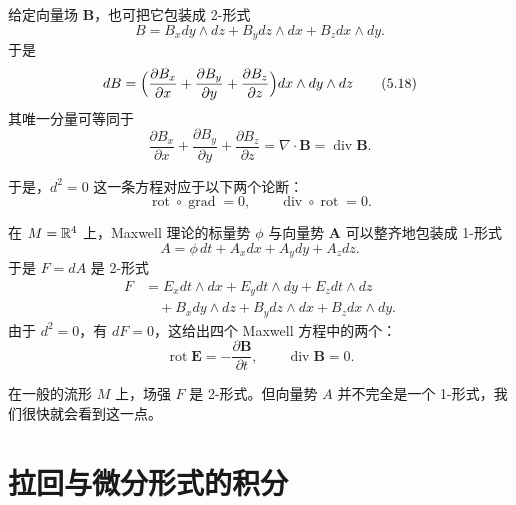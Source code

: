 给定向量场 $\mathbf{B}$，也可把它包装成 2-形式
\begin{equation}
  B=B_xdy\wedge dz+B_ydz\wedge dx+B_zdx\wedge dy.
  \tag{5.17}
\end{equation}
于是
\begin{equation}
  dB=\Bigl(\frac{\partial B_x}{\partial x}+\frac{\partial B_y}{\partial y}+\frac{\partial B_z}{\partial z}\Bigr)dx\wedge dy\wedge dz
  \tag{5.18}
\end{equation}
其唯一分量可等同于
\begin{equation}
  \frac{\partial B_x}{\partial x}+\frac{\partial B_y}{\partial y}+\frac{\partial B_z}{\partial z}
  =\nabla\cdot\mathbf{B}=\operatorname{div}\mathbf{B}.
  \tag{5.19}
\end{equation}

于是，$d^2=0$ 这一条方程对应于以下两个论断：
\begin{equation}
  \operatorname{rot}\circ\operatorname{grad}=0,\qquad
  \operatorname{div}\circ\operatorname{rot}=0.
  \tag{5.20}
\end{equation}

在 $M=\mathbb{R}^4$ 上，Maxwell 理论的标量势 $\phi$ 与向量势 $\mathbf{A}$ 可以整齐地包装成 1-形式
\begin{equation}
  A=\phi\,dt+A_xdx+A_ydy+A_zdz.
  \tag{5.21}
\end{equation}
于是 $F=dA$ 是 2-形式
\begin{equation}
  \begin{aligned}
    F&=E_xdt\wedge dx+E_ydt\wedge dy+E_zdt\wedge dz\\
     &\quad +B_xdy\wedge dz+B_ydz\wedge dx+B_zdx\wedge dy.
  \end{aligned}
  \tag{5.22}
\end{equation}
由于 $d^2=0$，有 $dF=0$，这给出四个 Maxwell 方程中的两个：
\begin{equation}
  \operatorname{rot}\mathbf{E}=-\frac{\partial\mathbf{B}}{\partial t},\qquad
  \operatorname{div}\mathbf{B}=0.
  \tag{5.23}
\end{equation}

在一般的流形 $M$ 上，场强 $F$ 是 2-形式。但向量势 $A$ 并不完全是一个 1-形式，我们很快就会看到这一点。


\section{拉回与微分形式的积分}

